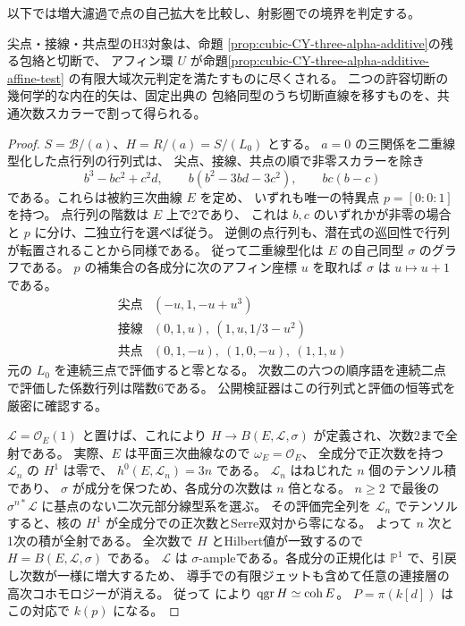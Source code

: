 以下では増大濾過で点の自己拡大を比較し、射影圏での境界を判定する。

\begin{theorem}\label{thm:cubic-CY-three-alpha-additive-H3}
尖点・接線・共点型のH3対象は、命題
\ref{prop:cubic-CY-three-alpha-additive}の残る包絡と切断で、
アフィン環 $U$ が命題\ref{prop:cubic-CY-three-alpha-additive-affine-test}
の有限大域次元判定を満たすものに尽くされる。
二つの許容切断の幾何学的な内在的矢は、固定出典\cite{AS4CYpinned}の
包絡同型のうち切断直線を移すものを、共通次数スカラーで割って得られる。
\end{theorem}
\begin{proof}
$S=\mathcal B/(a)$、$H=R/(a)=S/(L_0)$ とする。
$a=0$ の三関係を二重線型化した点行列の行列式は、
尖点、接線、共点の順で非零スカラーを除き
\[
 b^3-bc^2+c^2d,\qquad b(b^2-3bd-3c^2),\qquad bc(b-c)
\]
である。これらは被約三次曲線 $E$ を定め、
いずれも唯一の特異点 $p=[0:0:1]$ を持つ。
点行列の階数は $E$ 上で2であり、
これは $b,c$ のいずれかが非零の場合と $p$ に分け、二独立行を選べば従う。
逆側の点行列も、潜在式の巡回性で行列が転置されることから同様である。
従って二重線型化は $E$ の自己同型 $\sigma$ のグラフである。
$p$ の補集合の各成分に次のアフィン座標 $u$ を取れば
$\sigma$ は $u\mapsto u+1$ である。
\[
\begin{array}{c|l}
\text{尖点}&(-u,1,-u+u^3)\\
\text{接線}&(0,1,u),\ (1,u,1/3-u^2)\\
\text{共点}&(0,1,-u),\ (1,0,-u),\ (1,1,u)
\end{array}
\]
元の $L_0$ を連続三点で評価すると零となる。
次数二の六つの順序語を連続二点で評価した係数行列は階数6である。
公開検証器はこの行列式と評価の恒等式を厳密に確認する。

$\mathcal L=\mathcal O_E(1)$ と置けば、これにより
$H\to B(E,\mathcal L,\sigma)$ が定義され、次数2まで全射である。
実際、$E$ は平面三次曲線なので $\omega_E=\mathcal O_E$、
全成分で正次数を持つ $\mathcal L_n$ の $H^1$ は零で、
$h^0(E,\mathcal L_n)=3n$ である。
$\mathcal L_n$ はねじれた $n$ 個のテンソル積であり、
$\sigma$ が成分を保つため、各成分の次数は $n$ 倍となる。
$n\ge2$ で最後の $\sigma^{n*}\mathcal L$ に基点のない二次元部分線型系を選ぶ。
その評価完全列を $\mathcal L_n$ でテンソルすると、核の
$H^1$ が全成分での正次数とSerre双対から零になる。
よって $n$ 次と1次の積が全射である。
全次数で $H$ とHilbert値が一致するので
$H=B(E,\mathcal L,\sigma)$ である。
$\mathcal L$ は $\sigma$-ampleである。各成分の正規化は
$\mathbb P^1$ で、引戻し次数が一様に増大するため、
導手での有限ジェットも含めて任意の連接層の高次コホモロジーが消える。
従って \cite{AVdBTwistedHomogeneous} により $\operatorname{qgr} H\simeq\operatorname{coh}E$。
$P=\pi(k[d])$ はこの対応で $k(p)$ になる。


\end{proof}
